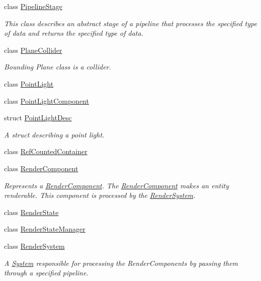 \begin{DoxyCompactItemize}
class \hyperlink{class_blade_1_1_pipeline_stage}{Pipeline\+Stage}
\begin{DoxyCompactList}\small\item\em This class describes an abstract stage of a pipeline that processes the specified type of data and returns the specified type of data. \end{DoxyCompactList}\item 
class \hyperlink{class_blade_1_1_plane_collider}{Plane\+Collider}
\begin{DoxyCompactList}\small\item\em Bounding Plane class is a collider. \end{DoxyCompactList}\item 
class \hyperlink{class_blade_1_1_point_light}{Point\+Light}
\item 
class \hyperlink{class_blade_1_1_point_light_component}{Point\+Light\+Component}
\item 
struct \hyperlink{struct_blade_1_1_point_light_desc}{Point\+Light\+Desc}
\begin{DoxyCompactList}\small\item\em A struct describing a point light. \end{DoxyCompactList}\item 
class \hyperlink{class_blade_1_1_ref_counted_container}{Ref\+Counted\+Container}
\item 
class \hyperlink{class_blade_1_1_render_component}{Render\+Component}
\begin{DoxyCompactList}\small\item\em Represents a \hyperlink{class_blade_1_1_render_component}{Render\+Component}. The \hyperlink{class_blade_1_1_render_component}{Render\+Component} makes an entity renderable. This component is processed by the \hyperlink{class_blade_1_1_render_system}{Render\+System}. \end{DoxyCompactList}\item 
class \hyperlink{class_blade_1_1_render_state}{Render\+State}
\item 
class \hyperlink{class_blade_1_1_render_state_manager}{Render\+State\+Manager}
\item 
class \hyperlink{class_blade_1_1_render_system}{Render\+System}
\begin{DoxyCompactList}\small\item\em A \hyperlink{class_blade_1_1_system}{System} responsible for processing the Render\+Components by passing them through a specified pipeline. \end{DoxyCompactList}\item 

\end{DoxyCompactItemize}
